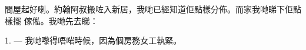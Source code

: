 %
%
%
%
%
%
%
%

\VUsaut{6.0mm}
\VUsaut{1.4mm}
\VUsaut{0.4mm}
\VUsaut{2.2mm}

間屋起好喇。約翰阿叔搬咗入新居，我哋已經知道佢點樣分佈。而家我哋睇下佢點樣擺
傢俬。我哋先去睇：

\VUsaut{3.0mm}

1. --- 我哋嚟得唔啱時候，因為個房務女工執緊。

